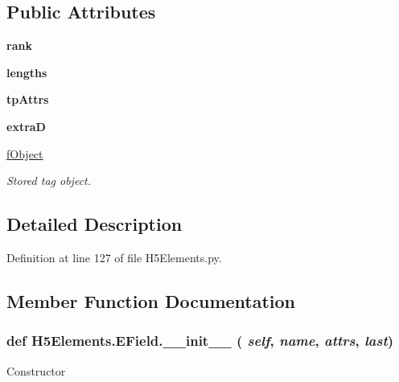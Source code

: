 \subsection*{Public Attributes}
\begin{DoxyCompactItemize}
\item 
\hypertarget{classH5Elements_1_1EField_a20fcb945f9ef6edef2c9f985130b1027}{
{\bfseries rank}}
\label{classH5Elements_1_1EField_a20fcb945f9ef6edef2c9f985130b1027}

\item 
\hypertarget{classH5Elements_1_1EField_a0eb574a560fd8be9ff14e3672fae3d7d}{
{\bfseries lengths}}
\label{classH5Elements_1_1EField_a0eb574a560fd8be9ff14e3672fae3d7d}

\item 
\hypertarget{classH5Elements_1_1EField_a4279511bf17bbc59fbf1fe19408a98e8}{
{\bfseries tpAttrs}}
\label{classH5Elements_1_1EField_a4279511bf17bbc59fbf1fe19408a98e8}

\item 
\hypertarget{classH5Elements_1_1EField_a5f0837583c5bf72ca38465ad218305d1}{
{\bfseries extraD}}
\label{classH5Elements_1_1EField_a5f0837583c5bf72ca38465ad218305d1}

\item 
\hypertarget{classH5Elements_1_1EField_ae8797dcd699ca34be6e5e20d73559250}{
\hyperlink{classH5Elements_1_1EField_ae8797dcd699ca34be6e5e20d73559250}{fObject}}
\label{classH5Elements_1_1EField_ae8797dcd699ca34be6e5e20d73559250}

\begin{DoxyCompactList}\small\item\em Stored tag object. \item\end{DoxyCompactList}\end{DoxyCompactItemize}


\subsection{Detailed Description}


Definition at line 127 of file H5Elements.py.

\subsection{Member Function Documentation}
\hypertarget{classH5Elements_1_1EField_ad58a5277143c1a17c5e004c92081d937}{
\subsubsection[{\_\-\_\-init\_\-\_\-}]{\setlength{\rightskip}{0pt plus 5cm}def H5Elements.EField.\_\-\_\-init\_\-\_\- ( {\em self}, \/   {\em name}, \/   {\em attrs}, \/   {\em last})}}
\label{classH5Elements_1_1EField_ad58a5277143c1a17c5e004c92081d937}
\begin{DoxyVerb}Constructor \end{DoxyVerb}
 

